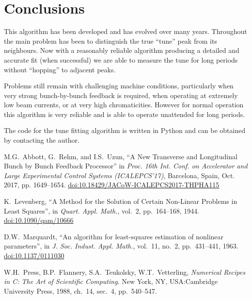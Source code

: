 \documentclass[
    a4paper,
    keeplastbox,            %
    hyphens,                %
    nospread,               %
    refpage,                %
]{jacow}
\begin{document}
\section{Conclusions}

This algorithm has been developed and has evolved over many years.  Throughout
the main problem has been to distinguish the true ``tune'' peak from its
neighbours.  Now with a reasonably reliable algorithm producing a detailed and
accurate fit (when successful) we are able to measure the tune for long periods
without ``hopping'' to adjacent peaks.

Problems still remain with challenging machine conditions, particularly when
very strong bunch-by-bunch feedback is required, when operating at extremely low
beam currents, or at very high chromaticities.  However for normal operation
this algorithm is very reliable and is able to operate unattended for long
periods.

The code for the tune fitting algorithm is written in Python and can be obtained
by contacting the author.


\begin{thebibliography}{99}


M.G.~Abbott, G.~Rehm, and I.S.~Uzun,
\enquote{A New Transverse and Longitudinal Bunch by Bunch Feedback Processor}
in \emph{Proc. 16th Int. Conf. on Accelerator and Large Experimental Control
Systems (ICALEPCS'17)}, Barcelona, Spain, Oct. 2017, pp. 1649--1654.
\url{doi:10.18429/JACoW-ICALEPCS2017-THPHA115}

K.~Levenberg, \enquote{A Method for the Solution of Certain Non-Linear Problems
in Least Squares}, in \emph{Quart. Appl. Math.}, vol.~2, pp.~164--168, 1944.
\url{doi:10.1090/qam/10666}

D.W.~Marquardt, \enquote{An algorithm for least-squares estimation of nonlinear
parameters}, in \emph{J. Soc. Indust. Appl. Math.}, vol.~11, no.~2,
pp.~431--441, 1963.
\url{doi:10.1137/0111030}

W.H.~Press, B.P.~Flannery, S.A.~Teukolsky, W.T.~Vetterling,
\emph{Numerical Recipes in C: The Art of Scientific Computing}.
New York, NY, USA:Cambridge University Press,
1988, ch.~14, sec.~4, pp.~540--547.


\end{thebibliography}
\end{document}
